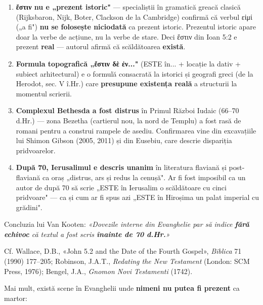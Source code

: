 \documentclass[12pt,a4paper,twoside,openany]{book}
\begin{document}
\begin{enumerate}
  \item \textbf{ἔστιν nu e „prezent istoric"} — specialiștii în gramatică greacă clasică (Rijksbaron, Nijk, Boter, Clackson de la Cambridge) confirmă că verbul εἰμί („a fi") \textbf{nu se folosește niciodată} ca prezent istoric. Prezentul istoric apare doar la verbe de acțiune, nu la verbe de stare. Deci ἔστιν din Ioan 5:2 e prezent \textbf{real} — autorul afirmă că scăldătoarea \textbf{există}.
  \item \textbf{Formula topografică „ἔστιν δὲ ἐν..."} (ESTE în... + locație la dativ + subiect arhitectural) e o formulă consacrată la istorici și geografi greci (de la Herodot, sec. V î.Hr.) care \textbf{presupune existența reală} a structurii la momentul scrierii.
  \item \textbf{Complexul Bethesda a fost distrus} în Primul Război Iudaic (66–70 d.Hr.) — zona Bezetha (cartierul nou, la nord de Templu) a fost rasă de romani pentru a construi rampele de asediu. Confirmarea vine din excavațiile lui Shimon Gibson (2005, 2011) și din Eusebiu, care descrie dispariția pridvoarelor.
  \item \textbf{După 70, Ierusalimul e descris unanim} în literatura flaviană și post-flaviană ca oraș „distrus, ars și redus la cenușă". Ar fi fost imposibil ca un autor de după 70 să scrie „ESTE în Ierusalim o scăldătoare cu cinci pridvoare" — ca și cum ar fi spus azi „ESTE în Hiroșima un palat imperial cu grădini".
\end{enumerate}
Concluzia lui Van Kooten: \textit{«Dovezile interne din Evanghelie par să indice \textbf{fără echivoc} că textul a fost scris \textbf{înainte de 70 d.Hr.}»}

Cf. Wallace, D.B., «John 5.2 and the Date of the Fourth Gospel», \textit{Biblica} 71 (1990) 177–205; Robinson, J.A.T., \textit{Redating the New Testament} (London: SCM Press, 1976); Bengel, J.A., \textit{Gnomon Novi Testamenti} (1742).

Mai mult, există scene în Evanghelii unde \textbf{nimeni nu putea fi prezent} ca martor:
\end{document}
